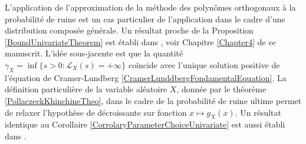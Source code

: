 L\rq{}application de l\rq{}approximation de la méthode des polynômes orthogonaux à la probabilité de ruine est un cas particulier de l\rq{}application dans le cadre d\rq{}une distribution composée générale. Un résultat proche de la Proposition \ref{BoundUnivariateTheorem} est établi dans \citet{GoLoPo15a}, voir Chapitre \ref{Chapter4} de ce manuscrit. L\rq{}idée sous-jacente est que la quantité $\gamma_{X}=\inf \{s>0 : \mathcal{L}_{X}(s)=+\infty\}$ coïncide avec l\rq{}unique solution positive de l\rq{}équation de Cramer-Lundberg \eqref{CramerLunddbergFondamentalEquation}. La définition particulière de la variable aléatoire $X$, donnée par le théorème \ref{PollaczeckKhinchineTheo}, dans le cadre de la probabilité de ruine ultime permet de relaxer l\rq{}hypothèse de décroissante sur fonction $x\mapsto g_{X}(x)$. Un résultat identique au Corollaire \ref{CorrolaryParameterChoiceUnivariate} est aussi établi dans \citet{GoLoPo15a}.

